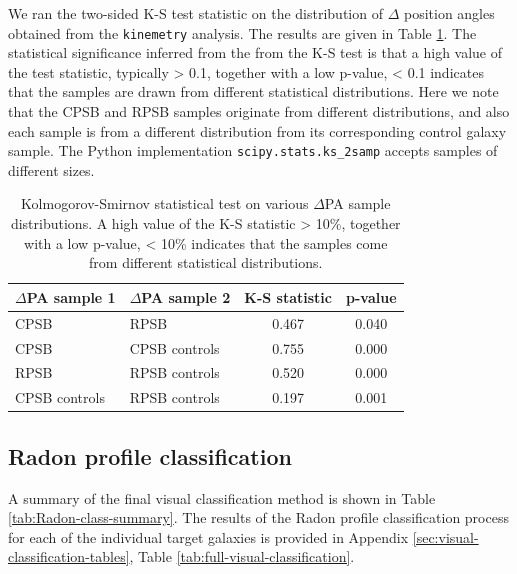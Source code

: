 We ran the two-sided K-S test statistic on the distribution of $\Delta$ position angles obtained from the \texttt{kinemetry} analysis. The results are given in Table \ref{tab:K-S-tests}. The statistical significance inferred from the from the K-S test is that a high value of the test statistic, typically > 0.1, together with a low p-value, < 0.1 indicates that the samples are drawn from different statistical distributions. Here we note that the CPSB and RPSB samples originate from different distributions, and also each sample is from a different distribution from its corresponding control galaxy sample. The Python implementation \texttt{scipy.stats.ks\_2samp} accepts samples of different sizes.

\begin{table}
\caption[Kolmogorov-Smirnov statistical test]{Kolmogorov-Smirnov statistical test on various $\Delta$PA sample distributions. A high value of the K-S statistic > 10\%, together with a low p-value, < 10\% indicates that the samples come from different statistical distributions.}
\label{tab:K-S-tests}
\begin{tabular}{llcc}
\hline
$\Delta$PA sample 1  & $\Delta$PA sample 2 & K-S statistic & p-value \\
\hline
CPSB & RPSB & 0.467 & 0.040 \\
CPSB & CPSB controls & 0.755 & 0.000 \\
RPSB & RPSB controls & 0.520 & 0.000 \\
CPSB controls & RPSB controls & 0.197 & 0.001 \\
\hline
\end{tabular}
\end{table}

\subsection{Radon profile classification}
\label{sec:Radon-profile-classification}

A summary of the final visual classification method is shown in Table \ref{tab:Radon-class-summary}. The results of the Radon profile classification process for each of the individual target galaxies is provided in Appendix \ref{sec:visual-classification-tables}, Table \ref{tab:full-visual-classification}. 

